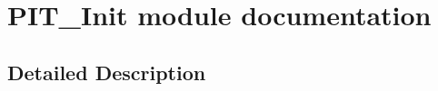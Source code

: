 \hypertarget{group___p_i_t___init__module}{}\section{P\+I\+T\+\_\+\+Init module documentation}
\label{group___p_i_t___init__module}


\subsection{Detailed Description}
